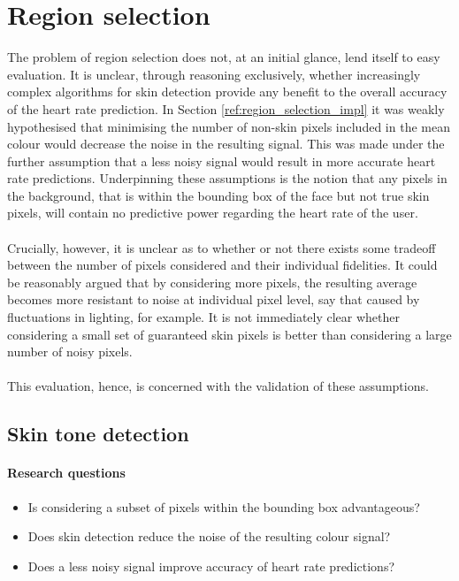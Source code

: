 \section{Region selection}
\label{section:region_selection}
The problem of region selection does not, at an initial glance, lend itself to easy evaluation.
It is unclear, through reasoning exclusively, whether increasingly complex algorithms for skin detection provide any benefit to the overall accuracy of the heart rate prediction.
In Section \ref{ref:region_selection_impl} it was weakly hypothesised that minimising the number of non-skin pixels included in the mean colour would decrease the noise in the resulting signal. 
This was made under the further assumption that a less noisy signal would result in more accurate heart rate predictions. 
Underpinning these assumptions is the notion that any pixels in the background, that is within the bounding box of the face but not true skin pixels, will contain no predictive power regarding the heart rate of the user.
\\\\
Crucially, however, it is unclear as to whether or not there exists some tradeoff between the number of pixels considered and their individual fidelities. 
It could be reasonably argued that by considering more pixels, the resulting average becomes more resistant to noise at individual pixel level, say that caused by fluctuations in lighting, for example.
It is not immediately clear whether considering a small set of guaranteed skin pixels is better than considering a large number of noisy pixels.
\\\\
This evaluation, hence, is concerned with the validation of these assumptions.
\subsection{Skin tone detection}
\label{section:skin_tone_detection}
\paragraph{Research questions}
\begin{itemize}
   \item Is considering a subset of pixels within the bounding box advantageous? 
   \item Does skin detection reduce the noise of the resulting colour signal?
   \item Does a less noisy signal improve accuracy of heart rate predictions?
\end{itemize}

